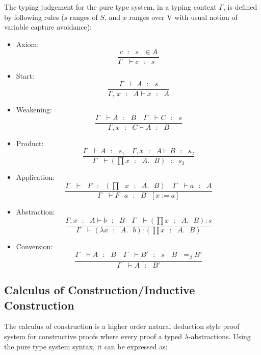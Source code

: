 \noindent 
The typing judgement for the pure type system, in a typing context $\Gamma$, is defined by following rules ($s$ ranges of $S$, and $x$ ranges over V 
 with usual notion of  variable capture avoidance):
 \begin{itemize}
 \item Axiom: \[ \frac{c \text{  } : \text{  }s \text{  } \in A}{\Gamma \text{  } \vdash c \text{  } : \text{  }s \text{  }} \]
 \item Start: \[ \frac{\Gamma \text{  } \vdash  A \text{  } : \text{  } s}{\Gamma \text{, } x \text{  } : \text{  } A \vdash  x \text{  } : \text{  } A} \]
 \item Weakening: \[ \frac{\Gamma \text{ } \vdash  A \text{  } : \text{  } B  \quad \Gamma \text{ } \vdash  C \text{  }: \text{  }s }{\Gamma,   x \text{  }: \text{  }C  \vdash  A \text{  }: \text{  }B } \]
 \item Product: \[ \frac{\Gamma \text{ } \vdash A \text{  }: \text{  }s_{1} \quad \Gamma,  x \text{  }: \text{  }A  \vdash  B \text{  }: \text{  }s_{2}}{\Gamma \text{ } \vdash (\prod  x\text{  } : \text{  }A. \text{  }B) \text{  }: \text{  }s_{3}} \]
 \item Application: \[ \frac{\Gamma \text{ }\vdash  \text{  }F \text{  }: \text{  }(\prod \text{  }x \text{  }: \text{  }A. \text{  }B) \quad \Gamma \text{ }\vdash  a\text{  } : \text{  }A }{\Gamma \text{ }\vdash  F\text{  } a \text{  }: \text{  }B \text{  }[x := a]} \]
 \item Abstraction: \[ \frac{\Gamma,  x\text{  } : \text{  }A \vdash  b \text{  } : \text{  } B \quad \Gamma \text{ }\vdash (\prod x\text{  } : \text{  }A. \text{  }B) : s }{\Gamma \text{ }\vdash (\lambda x \text{  }: \text{  }A. \text{  }b) : (\prod  x \text{  }: \text{  }A. \text{  }B)} \]
 \item Conversion: \[ \frac{\Gamma \text{ }\vdash  A \text{  }: \text{  }B  \quad \Gamma \text{ }\vdash  B' \text{  } : \text{  }s \quad B \text{  } =_{\beta}  B'}{\Gamma \text{ } \vdash A \text{  }: \text{  }B' } \]
\end{itemize}   



\subsection{Calculus of Construction/Inductive Construction}
\label{sec:cc}
The calculus of construction is a higher order  natural deduction style proof system 
for constructive proofs where every proof a typed $\lambda$-abstractions.  Using the 
pure type system syntax, it can be expressed as:

